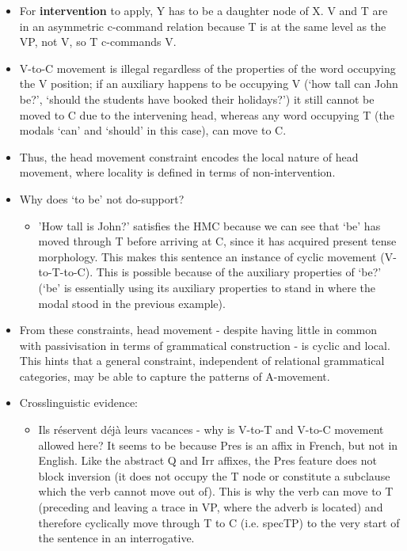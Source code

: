 \documentclass{article}
\begin{document}
\begin{itemize}
    \item For \textbf{intervention} to apply, Y has to be a daughter node of X. V and T are in an asymmetric c-command relation because T is at the same level as the VP, not V, so T c-commands V. 
    \item V-to-C movement is illegal regardless of the properties of the word occupying the V position; if an auxiliary happens to be occupying V (`how tall can John be?', `should the students have booked their holidays?') it still cannot be moved to C due to the intervening head, whereas any word occupying T (the modals `can' and `should' in this case), can move to C.
    \item Thus, the head movement constraint encodes the local nature of head movement, where locality is defined in terms of non-intervention.
    \item Why does `to be' not do-support?
    \begin{itemize}
        \item 'How tall is John?' satisfies the HMC because we can see that `be' has moved through T before arriving at C, since it has acquired present tense morphology. This makes this sentence an instance of cyclic movement (V-to-T-to-C). This is possible because of the auxiliary properties of `be?' (`be' is essentially using its auxiliary properties to stand in where the modal stood in the previous example).
    \end{itemize}
    \item From these constraints, head movement - despite having little in common with passivisation in terms of grammatical construction - is cyclic and local. This hints that a general constraint, independent of relational grammatical categories, may be able to capture the patterns of A-movement.
    \item Crosslinguistic evidence:
    \begin{itemize}
        \item Ils réservent déjà leurs vacances - why is V-to-T and V-to-C movement allowed here? It seems to be because Pres is an affix in French, but not in English. Like the abstract Q and Irr affixes, the Pres feature does not block inversion (it does not occupy the T node or constitute a subclause which the verb cannot move out of). This is why the verb can move to T (preceding and leaving a trace in VP, where the adverb is located) and therefore cyclically move through T to C (i.e. specTP) to the very start of the sentence in an interrogative.

\end{itemize}
\end{itemize}
\end{document}

